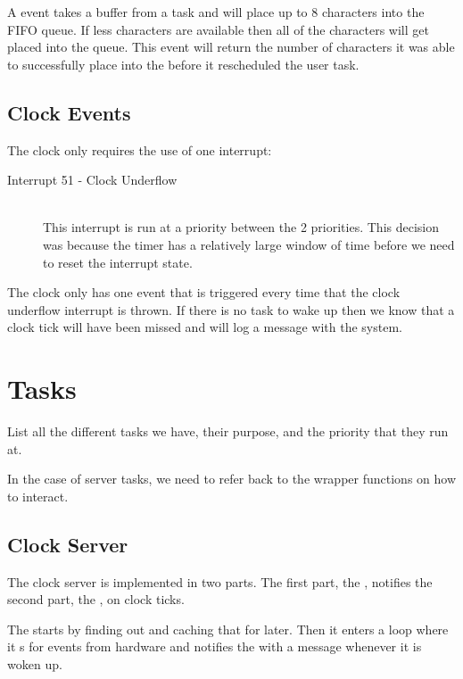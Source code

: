 \documentclass[pdftex,10pt,a4paper]{article}
\begin{document}
A  event takes a buffer from a task and will place up to 8
characters into the  FIFO queue. If less characters are available then
all of the characters will get placed into the queue. This event will return
the number of characters it was able to successfully place into the 
before it rescheduled the user task.

\subsection*{Clock Events}

The clock only requires the use of one interrupt:
\begin{description}
\item [Interrupt 51 - Clock Underflow] \hfill \\
	This interrupt is run at a priority between the 2  priorities.
	This decision was because the timer has a relatively large window of
	time before we need to reset the interrupt state.
\end{description}

The clock only has one event that is triggered every time that the clock
underflow interrupt is thrown. If there is no task to wake up then we know
that a clock tick will have been missed and will log a message with the system.


\section*{Tasks}

List all the different tasks we have, their purpose, and the priority
that they run at.

In the case of server tasks, we need to refer back to the wrapper
functions on how to interact.

\subsection*{Clock Server}

The clock server is implemented in two parts. The first part, the
, notifies the second part, the
, on clock ticks.

The  starts by finding out 
and caching that  for later. Then it enters a 
loop where it s for  events from hardware
and notifies the  with a  message whenever it
is woken up.
\end{document}
